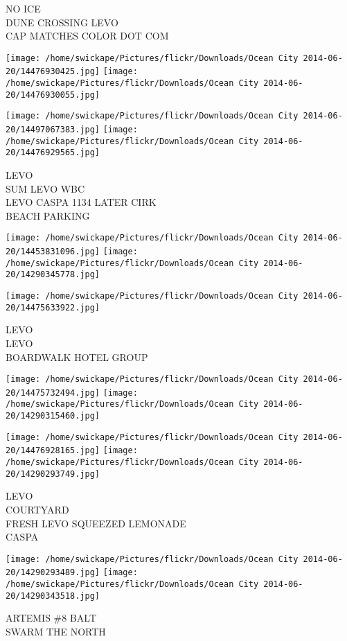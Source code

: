 \documentclass[10pt,letterpaper]{article}
\begin{document}
NO ICE\\
DUNE CROSSING LEVO\\
CAP MATCHES COLOR DOT COM\\
\pagebreak

\texttt{[image: /home/swickape/Pictures/flickr/Downloads/Ocean City 2014-06-20/14476930425.jpg]}
\texttt{[image: /home/swickape/Pictures/flickr/Downloads/Ocean City 2014-06-20/14476930055.jpg]}

\texttt{[image: /home/swickape/Pictures/flickr/Downloads/Ocean City 2014-06-20/14497067383.jpg]}
\texttt{[image: /home/swickape/Pictures/flickr/Downloads/Ocean City 2014-06-20/14476929565.jpg]}

LEVO\\
SUM LEVO WBC\\
LEVO CASPA 1134 LATER CIRK\\
BEACH PARKING\\
\pagebreak

\texttt{[image: /home/swickape/Pictures/flickr/Downloads/Ocean City 2014-06-20/14453831096.jpg]}
\texttt{[image: /home/swickape/Pictures/flickr/Downloads/Ocean City 2014-06-20/14290345778.jpg]}

\vspace{0.25in}
\texttt{[image: /home/swickape/Pictures/flickr/Downloads/Ocean City 2014-06-20/14475633922.jpg]}

LEVO\\
LEVO\\
BOARDWALK HOTEL GROUP\\
\pagebreak

\texttt{[image: /home/swickape/Pictures/flickr/Downloads/Ocean City 2014-06-20/14475732494.jpg]}
\texttt{[image: /home/swickape/Pictures/flickr/Downloads/Ocean City 2014-06-20/14290315460.jpg]}

\texttt{[image: /home/swickape/Pictures/flickr/Downloads/Ocean City 2014-06-20/14476928165.jpg]}
\texttt{[image: /home/swickape/Pictures/flickr/Downloads/Ocean City 2014-06-20/14290293749.jpg]}

LEVO\\
COURTYARD\\
FRESH LEVO SQUEEZED LEMONADE\\
CASPA\\
\pagebreak

\texttt{[image: /home/swickape/Pictures/flickr/Downloads/Ocean City 2014-06-20/14290293489.jpg]}
\texttt{[image: /home/swickape/Pictures/flickr/Downloads/Ocean City 2014-06-20/14290343518.jpg]}

ARTEMIS \#8 BALT\\
SWARM THE NORTH\\
\pagebreak
\end{document}
